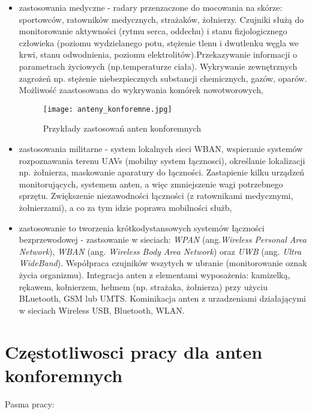 \begin{itemize}\setlength{\itemsep}{0pt}
	
	\item zastosowania medyczne - radary przenzaczone do mocowania na skórze: sportowców, ratowników medycznych, strażaków, żołnierzy. Czujniki służą do monitorowanie aktywności (rytmu serca, oddechu) i stanu fizjologicznego człowieka (poziomu wydzielanego potu, stężenie tlenu i dwutlenku węgla we krwi, stanu odwodnienia, poziomu elektrolitów).Przekazywanie informacji o parametrach życiowych (np.temperaturze ciała). Wykrywanie zewnętrznych zagrożeń np. stężenie niebezpiecznych substancji chemicznych, gazów, oparów. Możliwość zaastosowana do wykrywania komórek nowotworowych,  

\begin{figure}[h!]
\centering
	\texttt{[image: anteny\_konforemne.jpg]}
	\caption{Przykłady zastosowań anten konforemnych}
\end{figure}

	\item zastosowania militarne - system lokalnych sieci WBAN, wspieranie systemów rozpoznawania terenu UAVs (mobilny system łącznosci), określanie lokalizacji np. żołnierza, maskowanie aparatury do łączności.
	Zastapienie kilku urządzeń monitorujących, systemem anten, a więc zmniejszenie wagi potrzebnego sprzętu. Zwiększenie niezawodności łączności (z ratownikami medycznymi, żołnierzami), a co za tym idzie poprawa mobilności służb,      

	\item zastosowanie to tworzenia krótkodystansowych systemów łączności bezprzewodowej - zastsowanie w sieciach: \emph{WPAN} (ang.\emph{Wireless Personal Area Network}), \emph{WBAN} (ang. \emph{Wireless Body Area Network}) oraz \emph{UWB} (ang. \emph{Ultra WideBand}). Współpraca czujników wszytych w ubranie (monitorowanie oznak życia organizmu). Integracja anten z elementami wyposażenia: kamizelką, rękawem, kołnierzem, hełmem (np. strażaka, żołnierza) przy użyciu BLuetooth, GSM lub UMTS. Kominikacja anten z urzadzeniami działającymi w sieciach Wireless USB, Bluetooth, WLAN.  

\end{itemize}
	

\section{Częstotliwosci pracy dla anten konforemnych}

Pasma pracy:

